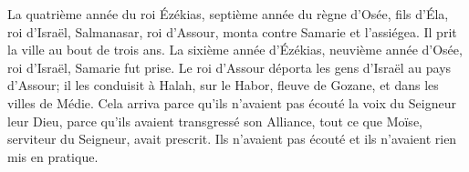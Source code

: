 La quatrième année du roi Ézékias,
	septième année du règne d’Osée, fils d’Éla, roi d’Israël,
	Salmanasar, roi d’Assour, monta contre Samarie et l’assiégea.
Il prit la ville au bout de trois ans.
	La sixième année d’Ézékias, neuvième année d’Osée, roi d’Israël, Samarie fut prise.
Le roi d’Assour déporta les gens d’Israël au pays d’Assour;
	il les conduisit à Halah, sur le Habor, fleuve de Gozane,
	et dans les villes de Médie.
Cela arriva parce qu’ils n’avaient pas écouté la voix du Seigneur leur Dieu,
	parce qu’ils avaient transgressé son Alliance,
	tout ce que Moïse, serviteur du Seigneur, avait prescrit.
Ils n’avaient pas écouté et ils n’avaient rien mis en pratique.
